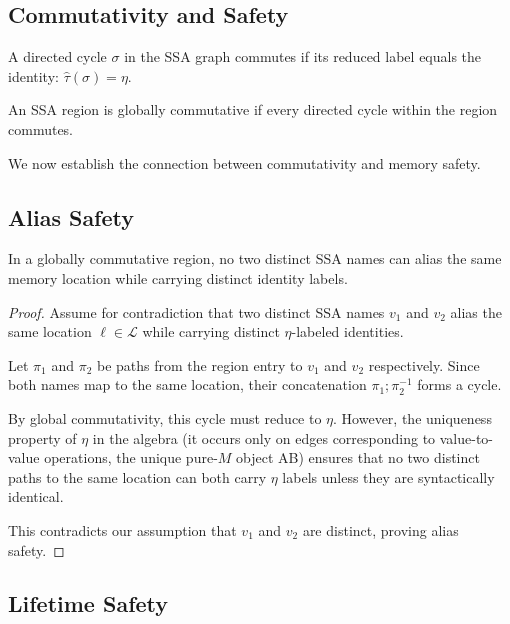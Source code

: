 \documentclass[journal]{IEEEtran}
\begin{document}
\subsection{Commutativity and Safety}

\begin{definition}
A directed cycle $\sigma$ in the SSA graph commutes if its reduced label equals the identity: $\hat{\tau}(\sigma) = \eta$.
\end{definition}

\begin{definition}
An SSA region is globally commutative if every directed cycle within the region commutes.
\end{definition}

We now establish the connection between commutativity and memory safety.

\subsection{Alias Safety}

\begin{theorem}
In a globally commutative region, no two distinct SSA names can alias the same memory location while carrying distinct identity labels.
\end{theorem}

\begin{proof}
Assume for contradiction that two distinct SSA names $v_1$ and $v_2$ alias the same location $\ell \in \mathcal{L}$ while carrying distinct $\eta$-labeled identities.

Let $\pi_1$ and $\pi_2$ be paths from the region entry to $v_1$ and $v_2$ respectively. Since both names map to the same location, their concatenation $\pi_1 ; \pi_2^{-1}$ forms a cycle.

By global commutativity, this cycle must reduce to $\eta$. However, the uniqueness property of $\eta$ in the algebra (it occurs only on edges corresponding to value-to-value operations, the unique pure-$M$ object AB) ensures that no two distinct paths to the same location can both carry $\eta$ labels unless they are syntactically identical.

This contradicts our assumption that $v_1$ and $v_2$ are distinct, proving alias safety.
\end{proof}

\subsection{Lifetime Safety}
\end{document}
